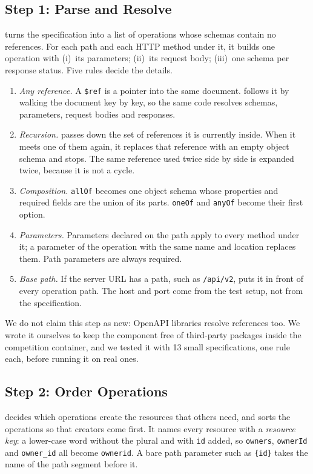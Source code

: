 \subsection{Step 1: Parse and Resolve}
\label{sec:step1}
\tool turns the specification into a list of operations whose schemas
contain no references. For each path and each HTTP method under it, it
builds one operation with (i)~its parameters; (ii)~its request body;
(iii)~one schema per response status. Five rules decide the details.
\begin{enumerate}
  \item \emph{Any reference.} A \texttt{\$ref} is a pointer into the same
    document. \tool follows it by walking the document key by key, so the
    same code resolves schemas, parameters, request bodies and responses.
  \item \emph{Recursion.} \tool passes down the set of references it is
    currently inside. When it meets one of them again, it replaces that
    reference with an empty object schema and stops. The same reference used
    twice side by side is expanded twice, because it is not a cycle.
  \item \emph{Composition.} \texttt{allOf} becomes one object schema whose
    properties and required fields are the union of its parts.
    \texttt{oneOf} and \texttt{anyOf} become their first option.
  \item \emph{Parameters.} Parameters declared on the path apply to every
    method under it; a parameter of the operation with the same name and
    location replaces them. Path parameters are always required.
  \item \emph{Base path.} If the server URL has a path, such as
    \texttt{/api/v2}, \tool puts it in front of every operation path. The
    host and port come from the test setup, not from the specification.
\end{enumerate}
We do not claim this step as new: OpenAPI libraries resolve references too.
We wrote it ourselves to keep the component free of third-party packages
inside the competition container, and we tested it with 13 small
specifications, one rule each, before running it on real ones.

\subsection{Step 2: Order Operations}
\label{sec:step2}
\tool decides which operations create the resources that others need, and
sorts the operations so that creators come first. It names every resource
with a \emph{resource key}: a lower-case word without the plural and with
\texttt{id} added, so \texttt{owners}, \texttt{ownerId} and
\texttt{owner\_id} all become \texttt{ownerid}. A bare path parameter such as
\texttt{\{id\}} takes the name of the path segment before it.

